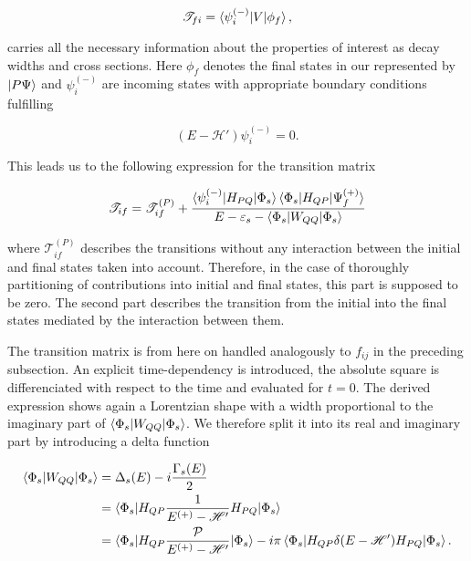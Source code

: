 \begin{equation}
  \mathscr{T}_{fi} = \braket{\psi_i^{(-)}|V|\phi_f},
\end{equation}

carries all the necessary information about the properties of interest as
decay widths and cross sections.
Here $\phi_f$ denotes the final states in our represented by $\ket{P \Psi}$ and
$\psi_i^{(-)}$ are incoming states with appropriate boundary conditions fulfilling

\begin{equation}
  (E - \mathscr{H}') \psi_i^{(-)} = 0 .
\end{equation}

This leads us to the following expression for the transition matrix

\begin{equation}
  \mathscr{T}_{if} = \mathscr{T}_{if}^{(P)} + 
                     \frac{\braket{\psi_i^{(-)}|H_{PQ}|\Phi_s}
                           \braket{\Phi_s|H_{QP}|\Psi_f^{(+)}}}
                          {E-\varepsilon_s - \braket{\Phi_s|W_{QQ}|\Phi_s}}
\end{equation}

where $\mathscr{T}_{if}^{(P)}$ describes the transitions without any interaction
between the initial and final states taken into account. Therefore, in the case
of thoroughly partitioning of contributions into initial and final states,
this part is supposed to be zero. The second part describes the transition
from the initial into the final states mediated by the interaction between them.

The transition matrix is from here on handled analogously to $f_{ij}$ in the preceding subsection.
An explicit time-dependency is introduced, the absolute square is differenciated
with respect to the time and evaluated for $t=0$.
The derived expression shows again a Lorentzian shape with a width proportional to
the imaginary part of $\braket{\Phi_s|W_{QQ}|\Phi_s}$. We therefore split it into
its real and imaginary part by introducing a delta function

\begin{align}
  \braket{\Phi_s|W_{QQ}|\Phi_s} & = \Delta_s(E) - i \frac{\Gamma_s(E)}{2}\\
                                & = \braket{\Phi_s|H_{QP}
                                    \frac{1}{E^{(+)}  - \mathscr{H}'}H_{PQ}|\Phi_s}\\
                                & = \braket{\Phi_s|H_{QP}
                                    \frac{\mathcal{P}}{E^{(+)} - \mathscr{H}'}|\Phi_s}
                                    - i\pi \braket{\Phi_s|H_{QP}\delta(E-\mathscr{H}')H_{PQ}
                                    |\Phi_s} .
\end{align}

